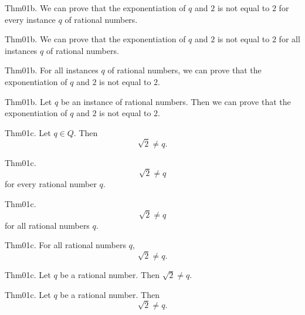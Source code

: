 \documentclass{article}
\begin{document}
Thm01b. We can prove that the exponentiation of $q$ and $2$ is not equal to $2$ for every instance $q$ of rational numbers.

Thm01b. We can prove that the exponentiation of $q$ and $2$ is not equal to $2$ for all instances $q$ of rational numbers.

Thm01b. For all instances $q$ of rational numbers, we can prove that the exponentiation of $q$ and $2$ is not equal to $2$.

Thm01b. Let $q$ be an instance of rational numbers. Then we can prove that the exponentiation of $q$ and $2$ is not equal to $2$.

Thm01c. Let $q \in Q$. Then $$\sqrt{ 2}\neq q.$$

Thm01c. $$\sqrt{ 2}\neq q$$ for every rational number $q$.

Thm01c. $$\sqrt{ 2}\neq q$$ for all rational numbers $q$.

Thm01c. For all rational numbers $q$, $$\sqrt{ 2}\neq q.$$

Thm01c. Let $q$ be a rational number. Then $\sqrt{ 2}\neq q$.

Thm01c. Let $q$ be a rational number. Then $$\sqrt{ 2}\neq q.$$
\end{document}
